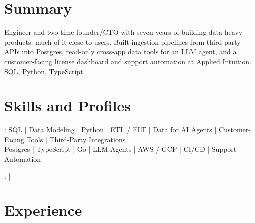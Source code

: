 \documentclass[print]{jack-resume}
\begin{document}
\pagecolor{darkmodeBackground}


\begin{minipage}[t][1cm][t]{.03\textwidth}
    \hfill
\end{minipage}

\section{Summary}
Engineer and two-time founder/CTO with seven years of building data-heavy products, much of it close to users. Built ingestion pipelines from third-party APIs into Postgres, read-only cross-app data tools for an LLM agent, and a customer-facing license dashboard and support automation at Applied Intuition. SQL, Python, TypeScript.
\sectionsep

\section{Skills and Profiles}
:
SQL \hfill | \hfill
Data Modeling \hfill | \hfill
Python \hfill | \hfill
ETL / ELT \hfill | \hfill
Data for AI Agents \hfill | \hfill
Customer-Facing Tools \hfill | \hfill
Third-Party Integrations \\
\hspace{1.0cm} Postgres \hfill | \hfill
TypeScript \hfill | \hfill
Go \hfill | \hfill
LLM Agents \hfill | \hfill
AWS / GCP \hfill | \hfill
CI/CD \hfill | \hfill
Support Automation \\

\raggedright{
    :
      \href{https://www.linkedin.com/in/jack-sturtevant/}{ \ExternalLink} |
     \href{https://github.com/jacksturt}{ \ExternalLink}}

\section{Experience}
\end{document}
